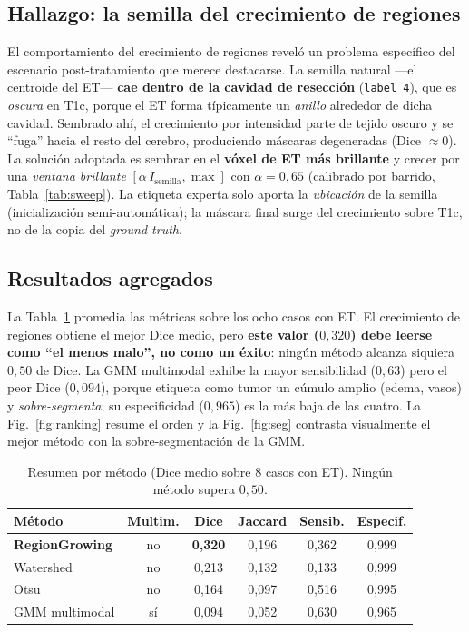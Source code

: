 \documentclass[conference]{IEEEtran}
\begin{document}
\subsection{Hallazgo: la semilla del crecimiento de regiones}
El comportamiento del crecimiento de regiones reveló un problema
específico del escenario post-tratamiento que merece destacarse.
La semilla natural ---el centroide del ET--- \textbf{cae dentro de
la cavidad de resección} (\texttt{label~4}), que es \emph{oscura}
en T1c, porque el ET forma típicamente un \emph{anillo} alrededor
de dicha cavidad. Sembrado ahí, el crecimiento por intensidad parte
de tejido oscuro y se ``fuga'' hacia el resto del cerebro,
produciendo máscaras degeneradas (Dice $\approx 0$). La solución
adoptada es sembrar en el \textbf{vóxel de ET más brillante} y
crecer por una \emph{ventana brillante} $[\alpha\,I_{\text{semilla}},
\max]$ con $\alpha=0{,}65$ (calibrado por barrido,
Tabla~\ref{tab:sweep}). La etiqueta experta solo aporta la
\emph{ubicación} de la semilla (inicialización semi-automática); la
máscara final surge del crecimiento sobre T1c, no de la copia del
\textit{ground truth}.

\subsection{Resultados agregados}
La Tabla~\ref{tab:resumen} promedia las métricas sobre los ocho
casos con ET. El crecimiento de regiones obtiene el mejor Dice
medio, pero \textbf{este valor ($0{,}320$) debe leerse como ``el
menos malo'', no como un éxito}: ningún método alcanza siquiera
$0{,}50$ de Dice. La GMM multimodal exhibe la mayor sensibilidad
($0{,}63$) pero el peor Dice ($0{,}094$), porque etiqueta como
tumor un cúmulo amplio (edema, vasos) y \emph{sobre-segmenta}; su
especificidad ($0{,}965$) es la más baja de las cuatro. La
Fig.~\ref{fig:ranking} resume el orden y la Fig.~\ref{fig:seg}
contrasta visualmente el mejor método con la sobre-segmentación de
la GMM.

\begin{table}[h]
\centering
\caption{Resumen por método (Dice medio sobre 8 casos con ET).
Ningún método supera $0{,}50$.}
\label{tab:resumen}
\begin{tabular}{lccccc}
\toprule
Método & Multim. & Dice & Jaccard & Sensib. & Especif. \\
\midrule
\textbf{RegionGrowing} & no & \textbf{0,320} & 0,196 & 0,362 & 0,999 \\
Watershed              & no & 0,213 & 0,132 & 0,133 & 0,999 \\
Otsu                   & no & 0,164 & 0,097 & 0,516 & 0,995 \\
GMM multimodal         & sí & 0,094 & 0,052 & 0,630 & 0,965 \\
\bottomrule
\end{tabular}
\end{table}
\end{document}
